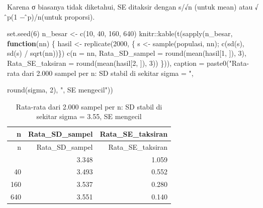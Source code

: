 \documentclass[
  indonesian,
  letterpaper,
]{book}
\newenvironment{Shaded}{\begin{snugshade}}{\end{snugshade}}
\newcommand{\AttributeTok}[1]{\textcolor[rgb]{0.40,0.45,0.13}{#1}}
\newcommand{\ControlFlowTok}[1]{\textcolor[rgb]{0.00,0.23,0.31}{\textbf{#1}}}
\newcommand{\DecValTok}[1]{\textcolor[rgb]{0.68,0.00,0.00}{#1}}
\newcommand{\FunctionTok}[1]{\textcolor[rgb]{0.28,0.35,0.67}{#1}}
\newcommand{\NormalTok}[1]{\textcolor[rgb]{0.00,0.23,0.31}{#1}}
\newcommand{\OtherTok}[1]{\textcolor[rgb]{0.00,0.23,0.31}{#1}}
\newcommand{\SpecialCharTok}[1]{\textcolor[rgb]{0.37,0.37,0.37}{#1}}
\newcommand{\StringTok}[1]{\textcolor[rgb]{0.13,0.47,0.30}{#1}}
\begin{document}
Karena σ biasanya tidak diketahui, SE ditaksir dengan s/√n (untuk mean)
atau √ ̂p(1 − ̂p)/n(untuk proporsi).

\begin{Shaded}
\begin{Highlighting}[]
\FunctionTok{set.seed}\NormalTok{(}\DecValTok{6}\NormalTok{)}
\NormalTok{n\_besar }\OtherTok{\textless{}{-}} \FunctionTok{c}\NormalTok{(}\DecValTok{10}\NormalTok{, }\DecValTok{40}\NormalTok{, }\DecValTok{160}\NormalTok{, }\DecValTok{640}\NormalTok{)}
\NormalTok{knitr}\SpecialCharTok{::}\FunctionTok{kable}\NormalTok{(}\FunctionTok{t}\NormalTok{(}\FunctionTok{sapply}\NormalTok{(n\_besar, }\ControlFlowTok{function}\NormalTok{(nn) \{}
\NormalTok{hasil }\OtherTok{\textless{}{-}} \FunctionTok{replicate}\NormalTok{(}\DecValTok{2000}\NormalTok{, \{ s }\OtherTok{\textless{}{-}} \FunctionTok{sample}\NormalTok{(populasi, nn); }\FunctionTok{c}\NormalTok{(}\FunctionTok{sd}\NormalTok{(s), }\FunctionTok{sd}\NormalTok{(s) }\SpecialCharTok{/} \FunctionTok{sqrt}\NormalTok{(nn))\})}
\FunctionTok{c}\NormalTok{(}\AttributeTok{n =}\NormalTok{ nn, }\AttributeTok{Rata\_SD\_sampel =} \FunctionTok{round}\NormalTok{(}\FunctionTok{mean}\NormalTok{(hasil[}\DecValTok{1}\NormalTok{, ]), }\DecValTok{3}\NormalTok{),}
\AttributeTok{Rata\_SE\_taksiran =} \FunctionTok{round}\NormalTok{(}\FunctionTok{mean}\NormalTok{(hasil[}\DecValTok{2}\NormalTok{, ]), }\DecValTok{3}\NormalTok{))}
\NormalTok{\})), }\AttributeTok{caption =} \FunctionTok{paste0}\NormalTok{(}\StringTok{"Rata{-}rata dari 2.000 sampel per n: SD stabil di sekitar sigma = "}\NormalTok{,}

\FunctionTok{round}\NormalTok{(sigma, }\DecValTok{2}\NormalTok{), }\StringTok{", SE mengecil"}\NormalTok{))}
\end{Highlighting}
\end{Shaded}

\begin{longtable}[]{@{}rrr@{}}
\caption{Rata-rata dari 2.000 sampel per n: SD stabil di sekitar sigma =
3.55, SE mengecil}\tabularnewline
\toprule\noalign{}
n & Rata\_SD\_sampel & Rata\_SE\_taksiran \\
\midrule\noalign{}
\endfirsthead
\toprule\noalign{}
n & Rata\_SD\_sampel & Rata\_SE\_taksiran \\
\midrule\noalign{}
\endhead
\bottomrule\noalign{}
\endlastfoot
10 & 3.348 & 1.059 \\
40 & 3.493 & 0.552 \\
160 & 3.537 & 0.280 \\
640 & 3.551 & 0.140 \\
\end{longtable}
\end{document}
